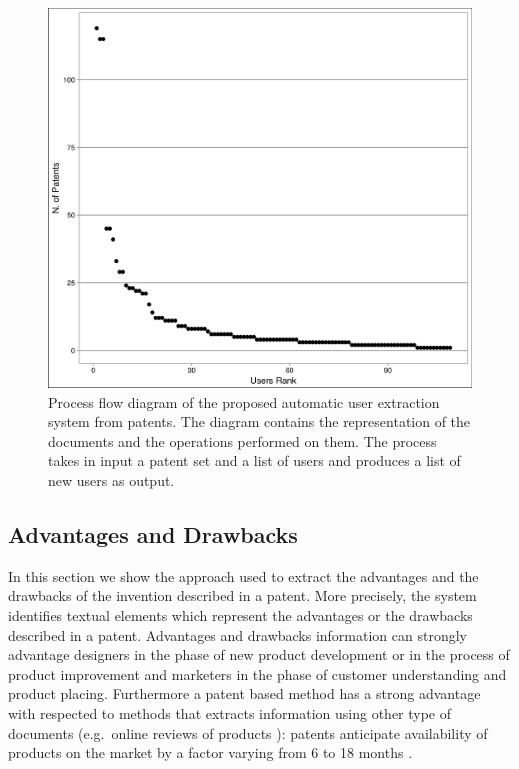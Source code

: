 \documentclass[]{book}
\begin{document}
\begin{figure}

{\centering \includegraphics[width=0.8\linewidth]{_bookdown_files/figures/user_rank} 

}

\caption{Process flow diagram of the proposed automatic user extraction system from patents. The diagram contains the representation of the documents and the operations performed on them. The process takes in input a patent set and a list of users and produces a list of new users as output.}\label{fig:patentsperuser}
\end{figure}

\subsection{Advantages and Drawbacks}\label{advdrwresults}

In this section we show the approach used to extract the advantages and
the drawbacks of the invention described in a patent. More precisely,
the system identifies textual elements which represent the advantages or
the drawbacks described in a patent. Advantages and drawbacks
information can strongly advantage designers in the phase of new product
development or in the process of product improvement and marketers in
the phase of customer understanding and product placing. Furthermore a
patent based method has a strong advantage with respected to methods
that extracts information using other type of documents (e.g.~online
reviews of products \citep{monireh}): patents anticipate availability of
products on the market by a factor varying from 6 to 18 months
\citep{golzio2012}.
\end{document}
